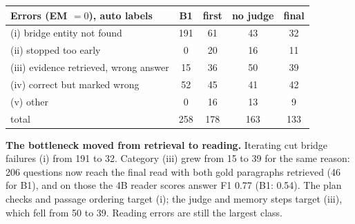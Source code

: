 \documentclass[10pt,a4paper]{article}
\begin{document}
\begin{minipage}[t]{0.47\textwidth}
\vspace{0pt}
\centering\footnotesize
\begin{tabular}{@{}lcccc@{}}
\toprule
Errors (EM $=0$), auto labels & B1 & first & no judge & final\\
\midrule
(i) bridge entity not found & 191 & 61 & 43 & 32\\
(ii) stopped too early & 0 & 20 & 16 & 11\\
(iii) evidence retrieved, wrong answer & 15 & 36 & 50 & 39\\
(iv) correct but marked wrong & 52 & 45 & 41 & 42\\
(v) other & 0 & 16 & 13 & 9\\
\midrule
total & 258 & 178 & 163 & 133\\
\bottomrule
\end{tabular}
\label{tab:cats}
\end{minipage}\hfill
\begin{minipage}[t]{0.505\textwidth}
\vspace{0pt}
\textbf{The bottleneck moved from retrieval to reading.} Iterating cut bridge failures (i) from 191 to 32.
Category (iii) grew from 15 to 39 for the same reason: 206 questions now reach the final read with both gold
paragraphs retrieved (46 for B1), and on those the 4B reader scores answer F1 0.77 (B1: 0.54). The plan checks
and passage ordering target (i); the judge and memory steps target (iii), which fell from 50 to 39. Reading
errors are still the largest class.
\end{minipage}
\end{document}
